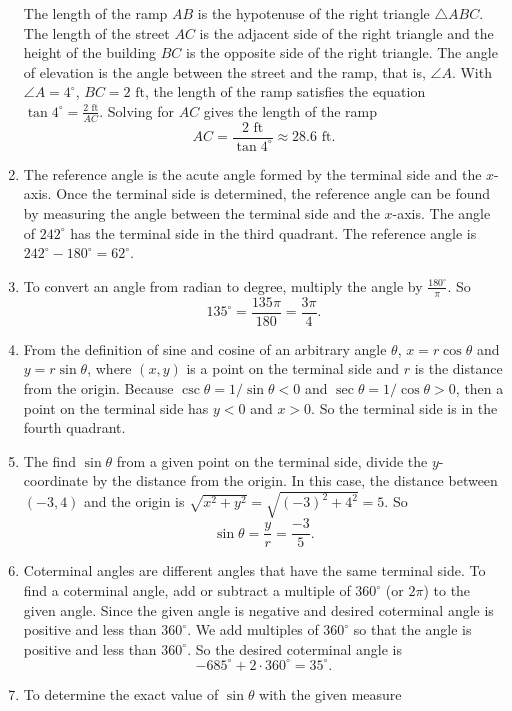 \documentclass[
  12pt]{article}
\begin{document}
\begin{enumerate}
  The length of the ramp \(AB\) is the hypotenuse of the right triangle
  \(\triangle ABC\). The length of the street \(AC\) is the adjacent
  side of the right triangle and the height of the building \(BC\) is
  the opposite side of the right triangle. The angle of elevation is the
  angle between the street and the ramp, that is, \(\angle A\). With
  \(\angle A = 4^\circ\), \(BC =  2 \text{ ft}\), the length of the ramp
  satisfies the equation \(\tan 4^\circ = \frac{2 \text{ ft}}{AC}\).
  Solving for \(AC\) gives the length of the ramp
  \[AC = \frac{2 \text{ ft}}{\tan 4^\circ} \approx 28.6 \text{ ft}.\]
\item
  The reference angle is the acute angle formed by the terminal side and
  the \(x\)-axis. Once the terminal side is determined, the reference
  angle can be found by measuring the angle between the terminal side
  and the \(x\)-axis. The angle of \(242^\circ\) has the terminal side
  in the third quadrant. The reference angle is
  \(242^\circ-180^\circ=62^\circ\).
\item
  To convert an angle from radian to degree, multiply the angle by
  \(\frac{180^\circ}{\pi}\). So
  \[135^\circ = \frac{135\pi}{180} = \frac{3\pi}{4}.\]
\item
  From the definition of sine and cosine of an arbitrary angle
  \(\theta\), \(x = r\cos\theta\) and \(y = r\sin\theta\), where
  \((x, y)\) is a point on the terminal side and \(r\) is the distance
  from the origin. Because \(\csc\theta = 1/\sin\theta <0\) and
  \(\sec\theta = 1/\cos\theta >0\), then a point on the terminal side
  has \(y<0\) and \(x>0\). So the terminal side is in the fourth
  quadrant.
\item
  The find \(\sin \theta\) from a given point on the terminal side,
  divide the \(y\)-coordinate by the distance from the origin. In this
  case, the distance between \((-3, 4)\) and the origin is
  \(\sqrt{x^2+y^2}=\sqrt{(-3)^2+4^2} = 5\). So
  \[\sin \theta = \frac{y}{r} = \frac{-3}{5}.\]
\item
  Coterminal angles are different angles that have the same terminal
  side. To find a coterminal angle, add or subtract a multiple of
  \(360^\circ\) (or \(2\pi\)) to the given angle. Since the given angle
  is negative and desired coterminal angle is positive and less than
  \(360^\circ\). We add multiples of \(360^\circ\) so that the angle is
  positive and less than \(360^\circ\). So the desired coterminal angle
  is \[-685^\circ + 2\cdot 360^\circ = 35^\circ.\]
\item
  To determine the exact value of \(\sin\theta\) with the given measure

\end{enumerate}
\end{document}
